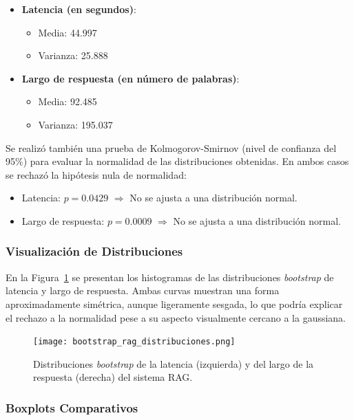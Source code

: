 \documentclass[runningheads]{llncs}
\begin{document}
\begin{itemize}
    \item \textbf{Latencia (en segundos)}:
    \begin{itemize}
        \item Media: 44.997
        \item Varianza: 25.888
    \end{itemize}
    
    \item \textbf{Largo de respuesta (en número de palabras)}:
    \begin{itemize}
        \item Media: 92.485
        \item Varianza: 195.037
    \end{itemize}
\end{itemize}

Se realizó también una prueba de Kolmogorov-Smirnov (nivel de confianza del 95\%) para evaluar la normalidad de las distribuciones obtenidas. En ambos casos se rechazó la hipótesis nula de normalidad:
\begin{itemize}
    \item Latencia: $p = 0.0429$ $\Rightarrow$ No se ajusta a una distribución normal.
    \item Largo de respuesta: $p = 0.0009$ $\Rightarrow$ No se ajusta a una distribución normal.
\end{itemize}

\subsubsection{Visualización de Distribuciones}

En la Figura~\ref{fig:bootstrap_distribuciones} se presentan los histogramas de las distribuciones \textit{bootstrap} de latencia y largo de respuesta. Ambas curvas muestran una forma aproximadamente simétrica, aunque ligeramente sesgada, lo que podría explicar el rechazo a la normalidad pese a su aspecto visualmente cercano a la gaussiana.

\begin{figure}[H]
    \centering
    \texttt{[image: bootstrap\_rag\_distribuciones.png]}
    \caption{Distribuciones \textit{bootstrap} de la latencia (izquierda) y del largo de la respuesta (derecha) del sistema RAG.}
    \label{fig:bootstrap_distribuciones}
\end{figure}

\subsubsection{Boxplots Comparativos}
\end{document}
